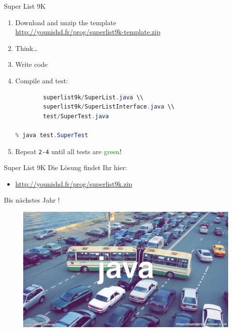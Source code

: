 \documentclass[18pt]{beamer}
\begin{document}
\begin{frame}[fragile]{Super List 9K}
    \begin{enumerate}
        \item Download and unzip the template\\ \url{http://younishd.fr/prog/superlist9k-template.zip}
        \item Think\dots
        \item Write code
        \item Compile and test:\\
        \begin{lstlisting}[language=Java,basicstyle=\scriptsize]
% javac superlist9k/SuperCell.java \\
        superlist9k/SuperList.java \\
        superlist9k/SuperListInterface.java \\
        test/SuperTest.java

% java test.SuperTest
        \end{lstlisting}
        \item Repeat \texttt{2-4} until all tests are \textcolor{green}{green}!
    \end{enumerate}
\end{frame}

\begin{frame}{Super List 9K}
    Die Lösung findet Ihr hier:
    \begin{itemize}
        \item \url{http://younishd.fr/prog/superlist9k.zip}
    \end{itemize}
\end{frame}

\appendix
\beginbackup

\begin{frame}{Bis nächstes Jahr !}
    \begin{figure}
        \includegraphics[scale=.25]{img/java.jpg}
    \end{figure}
\end{frame}

\backupend
\end{document}
